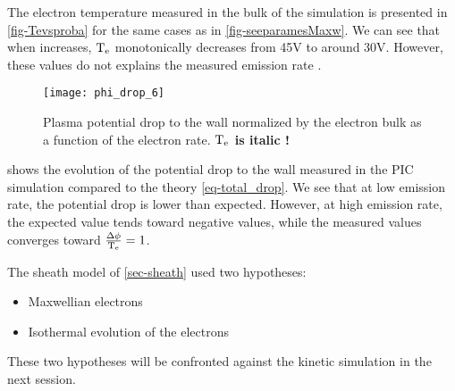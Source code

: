   The electron temperature measured in the bulk of the simulation is presented in \cref{fig-Tevsproba} for the same cases as in \cref{fig-seeparamesMaxw}.
  We can see that when \rate increases, $\mathrm{T_e}$ monotonically decreases from 45V to around 30V.
  However, these values do not explains the measured emission rate \ratepic.
    
  \begin{figure}[hbtp]
    \centering
    \texttt{[image: phi\_drop\_6]}
    \caption{Plasma potential drop to the wall normalized by the electron bulk as a function of the electron rate. {\bf $\mathrm{T_e}$ is italic !}}
    \label{fig-phi_rate}
  \end{figure}
  
   shows the evolution of the potential drop to the wall measured in the \ac{PIC} simulation compared to the theory \vref{eq-total_drop}.
  We see that at low emission rate, the potential drop is lower than expected.
  However, at high emission rate, the expected value tends toward negative values, while the measured values converges toward $\frac{\Delta \phi}{\mathrm{T_e}} = 1$.
  
  The sheath model of \cref{sec-sheath} used two hypotheses:
  \begin{itemize}
    \item Maxwellian electrons
    \item Isothermal evolution of the electrons
  \end{itemize}
  These two hypotheses will be confronted against the kinetic simulation in the next session.
  
  
   
